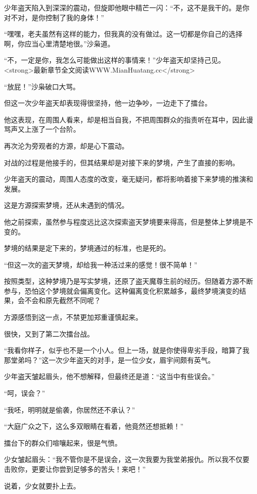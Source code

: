 \begin{this_body}
少年盗天陷入到深深的震动，但旋即他眼中精芒一闪：“不，这不是我干的。是你对不对，是你控制了我的身体！”

“嘿嘿，老夫虽然有这样的能力，但我真的没有做过。这一切都是你自己的选择啊，你应当心里清楚地很。”沙枭道。

“不，一定是你，我怎么可能做出这样的事情来！”少年盗天却坚持己见。<strong>最新章节全文阅读WWW.MianHuatang.cc</strong>

“放屁！”沙枭破口大骂。

但这一次少年盗天却表现得很坚持，他一边争吵，一边走下了擂台。

他这表现，在周围人看来，却是相当自我，不把周围群众的指责听在耳中，因此谩骂声又上涨了一个台阶。

再次沦为旁观者的方源，却是心下震动。

对战的过程是他接手的，但其结果却是对接下来的梦境，产生了直接的影响。

少年盗天的震动，周围人态度的改变，毫无疑问，都将影响着接下来梦境的推演和发展。

这是方源探索梦境，还从未遇到的情况。

他之前探索，虽然参与程度远比这次探索盗天梦境要来得高，但是整体上梦境是不变的。

梦境的结果是定下来的，梦境通过的标准，也是死的。

“但这一次的盗天梦境，却给我一种活过来的感觉！很不简单！”

按照类型，这种梦境乃是写实梦境，还原了盗天魔尊生前的经历。但随着方源不断参与，恐怕这个梦境就会偏离变化。这种偏离变化积累越多，最终梦境演变的结果，会不会和原先截然不同呢？

方源感悟到这一点，不禁更加郑重谨慎起来。

很快，又到了第二次擂台战。

“我看你样子，似乎也不是一个小人。但上一场，就是你使得卑劣手段，暗算了我那堂弟吗？”这一次少年盗天的对手，是一位少女，眉宇间颇有英气。

少年盗天皱起眉头，他不想解释，但最终还是道：“这当中有些误会。”

“呵，误会？”

“我呸，明明就是偷袭，你居然还不承认？”

“大庭广众之下，这么多双眼睛在看着，他竟然还想抵赖！”

擂台下的群众们喧嚷起来，很是气愤。

少女皱起眉头：“我不管你是不是误会，这一次我要为我堂弟报仇。所以我不仅要击败你，更要让你尝到足够多的苦头！来吧！”

说着，少女就要扑上去。


\end{this_body}
